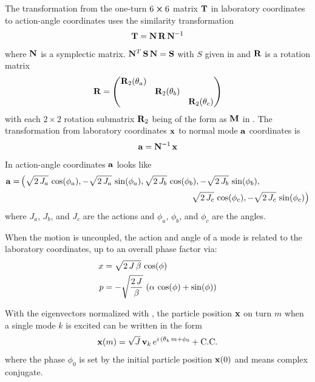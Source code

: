The transformation from the one-turn $6 \mathbin{\boldsymbol{\times}} 6$ matrix ${\bf T}$ in laboratory coordinates to
action-angle coordinates uses the similarity transformation
\begin{equation}
  {\bf T} = {\bf N} \, {\bf R} \, {\bf N}^{-1}
\end{equation}
where ${\bf N}$ is a symplectic matrix. ${\bf N}^T \, {\bf S} \, {\bf N} = {\bf S}$ with $S$ given in 
and ${\bf R}$ is a rotation matrix
\begin{equation}
  {\bf R} = \begin{pmatrix}
    {\bf R}_2(\theta_a) &                  &                  \\
                     & {\bf R}_2(\theta_b) &                  \\
                     &                  & {\bf R}_2(\theta_c)
  \end{pmatrix}
\end{equation}
with each $2 \times 2$ rotation submatrix ${\bf R}_2$ being of the form as ${\bf M}$ in .
The transformation from laboratory coordinates ${\bf x}$ to normal mode ${\bf a}$ coordinates is
\begin{equation}
  {\bf a} = {\bf N}^{-1} \, {\bf x}
\end{equation}
In action-angle coordinates ${\bf a}$ looks like
\begin{align}
  \bfa = &\left( \sqrt{2 \, J_a} \, \cos(\phi_a), -\sqrt{2 \, J_a} \, \sin(\phi_a), 
                 \sqrt{2 \, J_b} \, \cos(\phi_b), -\sqrt{2 \, J_b} \, \sin(\phi_b), \right. \\
        &\hskip20em \left. 
                 \sqrt{2 \, J_c} \, \cos(\phi_c), -\sqrt{2 \, J_c} \, \sin(\phi_c) 
         \right) \nonumber
\end{align}
where $J_a$, $J_b$, and $J_c$ are the actions and $\phi_a$, $\phi_b$, and $\phi_c$ are the angles.

When the motion is uncoupled, the action and angle of a mode is related to the laboratory coordinates, up
to an overall phase factor via:
\begin{align}
  x &= \sqrt{2 \, J \, \beta} \, \cos( \phi ) \nonumber \\
  p &= -\sqrt{\frac{2 \, J}{\beta}} \, \left( \alpha \, \cos( \phi ) + \sin( \phi ) \right) \nonumber \\
\end{align}

With the eigenvectors normalized with , the particle position ${\bf x}$ on turn $m$ when a
single mode $k$ is excited can be written in the form
\begin{equation}
  {\bf x}(m) = \sqrt{J} \, {\bf v}_k \, e^{i \, (\theta_k \, m + \phi_0} + \text{C.C.}
  \label{x2jv}
\end{equation}
where the phase $\phi_0$ is set by the initial particle position ${\bf x}(0)$ and  means
complex conjugate.

